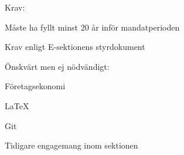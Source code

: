 \documentclass[10pt]{article}
\begin{document}
Krav:
\begin{dashlist}
    \item Måste ha fyllt minst 20 år inför mandatperioden
    \item Krav enligt E-sektionens styrdokument
\end{dashlist}

Önskvärt men ej nödvändigt:
\begin{dashlist}
    \item Företagsekonomi
    \item \LaTeX
    \item Git
    \item Tidigare engagemang inom sektionen
\end{dashlist}
\end{document}
